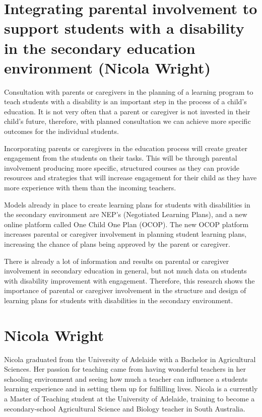 \documentclass[twoside,14pt,a4paper,notitlepage]{memoir}
\begin{document}
\section*{Integrating parental involvement to support students with a disability in the secondary education environment (Nicola Wright)}
\label{aut:wright}

Consultation with parents or caregivers in the planning of a learning program to teach students with a disability is an important step in the process of a child’s education. It is not very often that a parent or caregiver is not invested in their child’s future, therefore, with planned consultation we can achieve more specific outcomes for the individual students.

Incorporating parents or caregivers in the education process will create greater engagement from the students on their tasks. This will be through parental involvement producing more specific, structured courses as they can provide resources and strategies that will increase engagement for their child as they have more experience with them than the incoming teachers.

Models already in place to create learning plans for students with disabilities in the secondary environment are NEP’s (Negotiated Learning Plans), and a new online platform called One Child One Plan (OCOP). The new OCOP platform increases parental or caregiver involvement in planning student learning plans, increasing the chance of plans being approved by the parent or caregiver.

There is already a lot of information and results on parental or caregiver involvement in secondary education in general, but not much data on students with disability improvement with engagement. Therefore, this research shows the importance of parental or caregiver involvement in the structure and design of learning plans for students with disabilities in the secondary environment.

\section*{Nicola Wright}

Nicola graduated from the University of Adelaide with a Bachelor in Agricultural Sciences. Her passion for teaching came from having wonderful teachers in her schooling environment and seeing how much a teacher can influence a students learning experience and in setting them up for fulfilling lives. Nicola is a currently a Master of Teaching student at the University of Adelaide,
training to become a secondary-school Agricultural Science and Biology teacher in South Australia.
\end{document}
